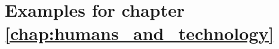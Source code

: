 \chapter{Examples for chapter \ref{chap:humans_and_technology}} \label{chap:humans_and_technology_examples}

